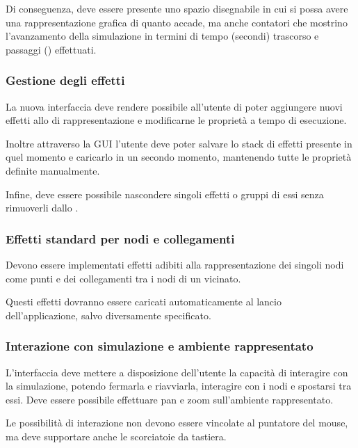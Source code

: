                 Di conseguenza, deve essere presente uno spazio disegnabile in cui si possa avere una rappresentazione grafica di quanto accade, ma anche contatori che mostrino l'avanzamento della simulazione in termini di tempo (secondi) trascorso e passaggi () effettuati.

            \subsubsection{Gestione degli effetti}\label{subusub:manageEffects}
                La nuova interfaccia deve rendere possibile all'utente di poter aggiungere nuovi effetti allo  di rappresentazione e modificarne le proprietà a tempo di esecuzione.

                Inoltre attraverso la GUI l'utente deve poter salvare lo stack di effetti presente in quel momento e caricarlo in un secondo momento, mantenendo tutte le proprietà definite manualmente.

                Infine, deve essere possibile nascondere singoli effetti o gruppi di essi senza rimuoverli dallo .

            \subsubsection{Effetti standard per nodi e collegamenti}\label{subusub:defaultEffects}
                Devono essere implementati effetti adibiti alla rappresentazione dei singoli nodi come punti e dei collegamenti tra i nodi di un vicinato.

                Questi effetti dovranno essere caricati automaticamente al lancio dell'applicazione, salvo diversamente specificato.

            \subsubsection{Interazione con simulazione e ambiente rappresentato}\label{subsub:interazione}
                L'interfaccia deve mettere a disposizione dell'utente la capacità di interagire con la simulazione, potendo fermarla e riavviarla, interagire con i nodi e spostarsi tra essi. Deve essere possibile effettuare pan e zoom sull'ambiente rappresentato.

                Le possibilità di interazione non devono essere vincolate al puntatore del mouse, ma deve supportare anche le scorciatoie da tastiera.

